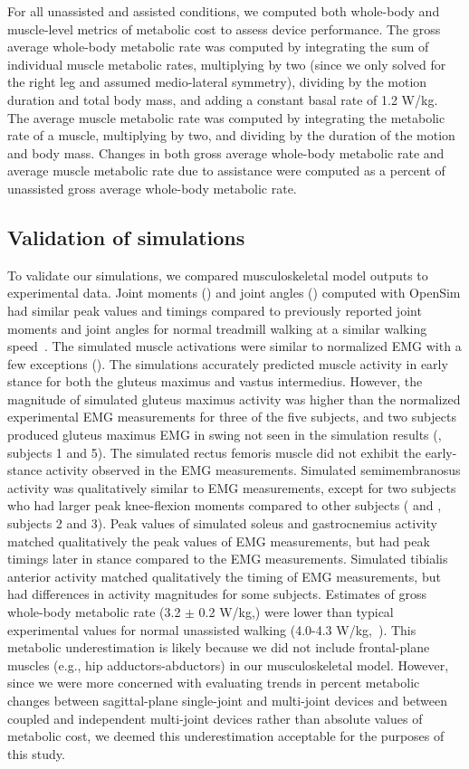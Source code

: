 \documentclass[10pt,letterpaper]{article}
\begin{document}
For all unassisted and assisted conditions, we computed both whole-body and muscle-level metrics of metabolic cost to assess device performance. The gross average whole-body metabolic rate was computed by integrating the sum of individual muscle metabolic rates, multiplying by two (since we only solved for the right leg and assumed medio-lateral symmetry), dividing by the motion duration and total body mass, and adding a constant basal rate of 1.2 W/kg. The average muscle metabolic rate was computed by integrating the metabolic rate of a muscle, multiplying by two, and dividing by the duration of the motion and body mass. Changes in both gross average whole-body metabolic rate and average muscle metabolic rate due to assistance were computed as a percent of unassisted gross average whole-body metabolic rate.

\subsection*{Validation of simulations}
To validate our simulations, we compared musculoskeletal model outputs to experimental data. Joint moments () and joint angles () computed with OpenSim had similar peak values and timings compared to previously reported joint moments and joint angles for normal treadmill walking at a similar walking speed~\cite{Silder:2013}. The simulated muscle activations were similar to normalized EMG with a few exceptions (). The simulations accurately predicted muscle activity in early stance for both the gluteus maximus and vastus intermedius. However, the magnitude of simulated gluteus maximus activity was higher than the normalized experimental EMG measurements for three of the five subjects, and two subjects produced gluteus maximus EMG in swing not seen in the simulation results (, subjects 1 and 5). The simulated rectus femoris muscle did not exhibit the early-stance activity observed in the EMG measurements. Simulated semimembranosus activity was qualitatively similar to EMG measurements, except for two subjects who had larger peak knee-flexion moments compared to other subjects ( and , subjects 2 and 3). Peak values of simulated soleus and gastrocnemius activity matched qualitatively the peak values of EMG measurements, but had peak timings later in stance compared to the EMG measurements. Simulated tibialis anterior activity matched qualitatively the timing of EMG measurements, but had differences in activity magnitudes for some subjects. Estimates of gross whole-body metabolic rate (3.2 $\pm$ 0.2 W/kg,) were lower than typical experimental values for normal unassisted walking (4.0-4.3 W/kg,~\cite{Waters:1999}). This metabolic underestimation is likely because we did not include frontal-plane muscles (e.g., hip adductors-abductors) in our musculoskeletal model. However, since we were more concerned with evaluating trends in percent metabolic changes between sagittal-plane single-joint and multi-joint devices and between coupled and independent multi-joint devices rather than absolute values of metabolic cost, we deemed this underestimation acceptable for the purposes of this study.
\end{document}
